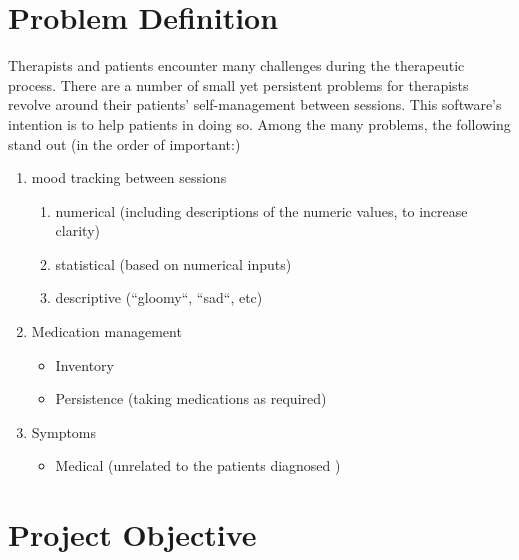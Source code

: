 \documentclass[11pt]{article}
\begin{document}

    \pagebreak

    \tableofcontents

    \pagebreak


    \section{Problem Definition}\label{sec:problem-definition}
    Therapists and patients encounter many challenges during the therapeutic process.
    There are a number of small yet persistent problems for therapists revolve around their patients' self-management between sessions.
    This software's intention is to help patients in doing so.
    Among the many problems, the following stand out (in the order of important:)
    \begin{enumerate}
        \item mood tracking between sessions
        \begin{enumerate}
            \item numerical (including descriptions of the numeric values, to increase clarity)
            \item statistical (based on numerical inputs)
            \item descriptive (``gloomy``, ``sad``, etc)
        \end{enumerate}
        \item Medication management
        \begin{itemize}
            \item Inventory
            \item Persistence (taking medications as required)
        \end{itemize}
        \item Symptoms
        \begin{itemize}
            \item Medical (unrelated to the patients diagnosed )
        \end{itemize}
    \end{enumerate}


    \section{Project Objective}\label{sec:project-objective}
\end{document}
